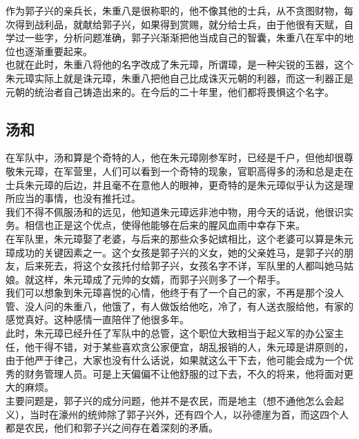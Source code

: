 \begin{multicols}{\theparacolNo}
作为郭子兴的亲兵长，朱重八是很称职的，他不像其他的士兵，从不贪图财物，每次得到战利品，就献给郭子兴，如果得到赏赐，就分给士兵，由于他很有天赋，自学过一些字，分析问题准确，郭子兴渐渐把他当成自己的智囊，朱重八在军中的地位也逐渐重要起来。\\

也就在此时，朱重八将他的名字改成了朱元璋，所谓璋，是一种尖锐的玉器，这个朱元璋实际上就是诛元璋，朱重八把他自己比成诛灭元朝的利器，而这一利器正是元朝的统治者自己铸造出来的。在今后的二十年里，他们都将畏惧这个名字。\\

\subsection{汤和}
在军队中，汤和算是个奇特的人，他在朱元璋刚参军时，已经是千户，但他却很尊敬朱元璋，在军营里，人们可以看到一个奇特的现象，官职高得多的汤和总是走在士兵朱元璋的后边，并且毫不在意他人的眼神，更奇特的是朱元璋似乎认为这是理所应当的事情，也没有推托过。\\

我们不得不佩服汤和的远见，他知道朱元璋远非池中物，用今天的话说，他很识实务。相信也正是这个优点，使得他能够在后来的腥风血雨中幸存下来。\\

在军队里，朱元璋娶了老婆，与后来的那些众多妃嫔相比，这个老婆可以算是朱元璋成功的关键因素之一。这个女孩是郭子兴的义女，她的父亲姓马，是郭子兴的朋友，后来死去，将这个女孩托付给郭子兴，女孩名字不详，军队里的人都叫她马姑娘。就这样，朱元璋成了元帅的女婿，而郭子兴则多了一个帮手。\\

我们可以想象到朱元璋喜悦的心情，他终于有了一个自己的家，不再是那个没人管、没人问的朱重八，他饿了，有人做饭给他吃，冷了，有人送衣服给他，有家的感觉真好。这种感情一直陪伴了他很多年。\\

此时，朱元璋已经升任了军队中的总管，这个职位大致相当于起义军的办公室主任，他干得不错，对于某些喜欢贪公家便宜，胡乱报销的人，朱元璋是讲原则的，由于他严于律己，大家也没有什么话说，如果就这么干下去，他可能会成为一个优秀的财务管理人员。可是上天偏偏不让他舒服的过下去，不久的将来，他将面对更大的麻烦。\\

主要问题是，郭子兴的成分问题，他并不是农民，而是地主（想不通他怎么会起义），当时在濠州的统帅除了郭子兴外，还有四个人，以孙德崖为首，而这四个人都是农民，他们和郭子兴之间存在着深刻的矛盾。\\


\end{multicols}
